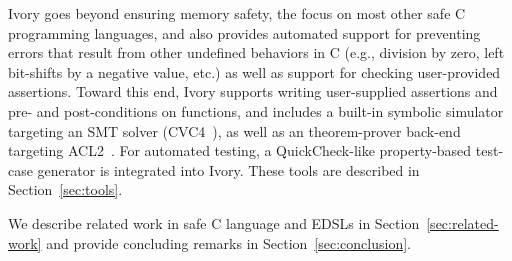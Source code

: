 Ivory goes beyond ensuring memory safety, the focus on most other safe C
programming languages, and also provides automated support for preventing errors
that result from other undefined behaviors in C (e.g., division by zero, left
bit-shifts by a negative value, etc.) as well as support for checking
user-provided assertions. Toward this end, Ivory supports writing user-supplied
assertions and pre- and post-conditions on functions, and includes a built-in
symbolic simulator targeting an SMT solver (CVC4~\cite{cvc4}), as well as an
theorem-prover back-end targeting ACL2~\cite{acl2}. For automated testing, a
QuickCheck-like property-based test-case generator is integrated into
Ivory. These tools are described in Section~\ref{sec:tools}.

We describe related work in safe C language and EDSLs in
Section~\ref{sec:related-work} and provide concluding remarks in
Section~\ref{sec:conclusion}.

